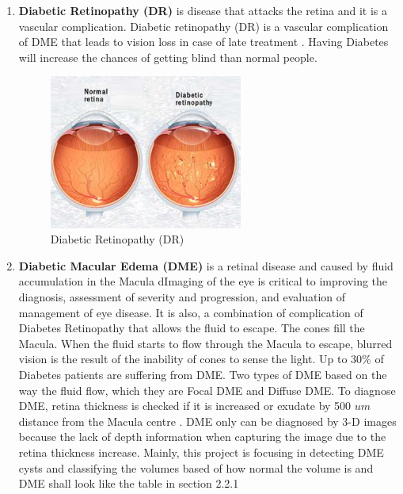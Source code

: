 \begin{enumerate}
\item \textbf{Diabetic Retinopathy (DR)} is disease that attacks the retina and it is a vascular complication.
Diabetic retinopathy (DR) is a vascular complication of DME that leads to vision loss in case of late treatment \cite{wilkinson2003proposed}.
Having Diabetes will increase the chances of getting blind than normal people.
\begin{figure}[htb]
        \centering
        \includegraphics[width=0.6\textwidth]{figures/DR.jpg} %
  \caption{Diabetic Retinopathy (DR) \cite{DR2016}}
  \label{fig:DR}
\end{figure}
\item \textbf{Diabetic Macular Edema (DME)} is a retinal disease and caused by fluid accumulation in the Macula dImaging of the eye is critical to improving the diagnosis, assessment of severity and progression, and evaluation of management of eye disease. 
It is also, a combination of complication of Diabetes Retinopathy that allows the fluid to escape.
The cones fill the Macula.
When the fluid starts to flow through the Macula to escape, blurred vision is the result of the inability of cones to sense the light.
Up to 30\% of Diabetes patients are suffering from DME. 
Two types of DME based on the way the fluid flow, which they are Focal DME and Diffuse DME.
To diagnose DME, retina thickness is checked if it is increased or exudate by 500 $um$ distance from the Macula centre \cite{bandello2010diabetic}.
DME only can be diagnosed by 3-D images because the lack of depth information when capturing the image due to the retina thickness increase.
Mainly, this project is focusing in detecting DME cysts and classifying the volumes based of how normal the volume is and DME shall look like the table in section 2.2.1


\end{enumerate}
